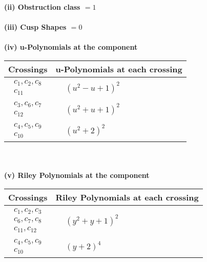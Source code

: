 \documentclass[1p]{elsarticle_modified}
\theoremstyle{definition}
\begin{document}
\flushleft \textbf{(ii) Obstruction class $= 1$}\\~\\
\flushleft \textbf{(iii) Cusp Shapes $= 0$}\\~\\
\newpage\renewcommand{\arraystretch}{1}
\flushleft \textbf{(iv) u-Polynomials at the component}\newline \\
\begin{tabular}{m{50pt}|m{274pt}}
Crossings & \hspace{64pt}u-Polynomials at each crossing \\
\hline $$\begin{aligned}c_{1},c_{2},c_{8}\\c_{11}\end{aligned}$$&$\begin{aligned}
&(u^2- u+1)^2
\end{aligned}$\\
\hline $$\begin{aligned}c_{3},c_{6},c_{7}\\c_{12}\end{aligned}$$&$\begin{aligned}
&(u^2+u+1)^2
\end{aligned}$\\
\hline $$\begin{aligned}c_{4},c_{5},c_{9}\\c_{10}\end{aligned}$$&$\begin{aligned}
&(u^2+2)^2
\end{aligned}$\\
\hline
\end{tabular}\\~\\
\newpage\renewcommand{\arraystretch}{1}
\flushleft \textbf{(v) Riley Polynomials at the component}\newline \\
\begin{tabular}{m{50pt}|m{274pt}}
Crossings & \hspace{64pt}Riley Polynomials at each crossing \\
\hline $$\begin{aligned}c_{1},c_{2},c_{3}\\c_{6},c_{7},c_{8}\\c_{11},c_{12}\end{aligned}$$&$\begin{aligned}
&(y^2+y+1)^2
\end{aligned}$\\
\hline $$\begin{aligned}c_{4},c_{5},c_{9}\\c_{10}\end{aligned}$$&$\begin{aligned}
&(y+2)^4
\end{aligned}$\\
\hline
\end{tabular}\\~\\
\end{document}
